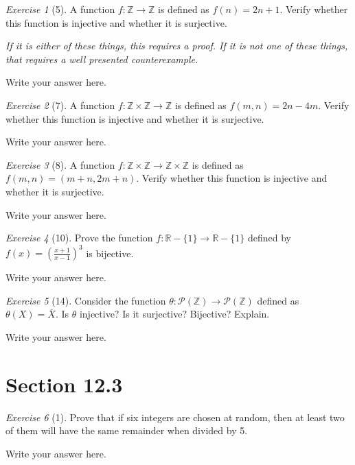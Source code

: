 \documentclass[12pt]{amsart}
\makeatletter
\theoremstyle{remark}
\newtheorem*{exercise}{Exercise}%
\def\RR{\ensuremath{\mathbb R}}
\def\ZZ{\ensuremath{\mathbb Z}}
\newcommand{\mc}[1]{\ensuremath{\mathcal{#1}}} %
\renewenvironment{proof}[1][\proofname]{\par\doublespacing
  \pushQED{\qed}%
  \normalfont \topsep6\p@\@plus6\p@\relax
  \list{}{%
    \settowidth{\leftmargin}{\itshape\proofname:\hskip\labelsep}%
    \setlength{\labelwidth}{0pt}%
    \setlength{\itemindent}{-\leftmargin}%
  }%
  \item[\hskip\labelsep\itshape#1\@addpunct{:}]\ignorespaces
}{%
  \popQED\endlist\@endpefalse
  \singlespacing
}
\theoremstyle{mycomment}
\makeatother
\begin{document}
\begin{exercise}[5] A function $f:\ZZ\to\ZZ$ is defined as $f(n)=2n+1$. Verify whether this function is injective and whether it is surjective.

\emph{If it is either of these things, this requires a proof. If it is not one of these things, that requires a well presented counterexample.}
\begin{proof}[Solution]
Write your answer here.
\end{proof}
\end{exercise}

\begin{exercise}[7] A function $f:\ZZ\times\ZZ\to \ZZ$ is defined as $f(m,n)=2n-4m$. Verify whether this function is injective and whether it is surjective.
\begin{proof}[Solution]
Write your answer here.
\end{proof}
\end{exercise}

\begin{exercise}[8] A function $f:\ZZ\times\ZZ\to \ZZ\times\ZZ$ is defined as $f(m,n)=(m+n,2m+n)$. Verify whether this function is injective and whether it is surjective.
\begin{proof}[Solution]
Write your answer here.
\end{proof}
\end{exercise}

\begin{exercise}[10] Prove the function $f:\RR-\{1\}\to \RR-\{1\}$ defined by $f(x)=\left(\frac{x+1}{x-1}\right)^{3}$ is bijective.
\begin{proof}
Write your answer here.
\end{proof}
\end{exercise}

\begin{exercise}[14] Consider the function $\theta:\mc P(\ZZ)\to\mc P(\ZZ)$ defined as $\theta(X)=\overline{X}$. Is $\theta$ injective? Is it surjective? Bijective? Explain.
\begin{proof}[Solution]
Write your answer here.
\end{proof}
\end{exercise}
\section*{Section 12.3}
\begin{exercise}[1] Prove that if six integers are chosen at random, then at least two of them will have the same remainder when divided by 5.
\begin{proof}
Write your answer here.
\end{proof}
\end{exercise}
\end{document}
